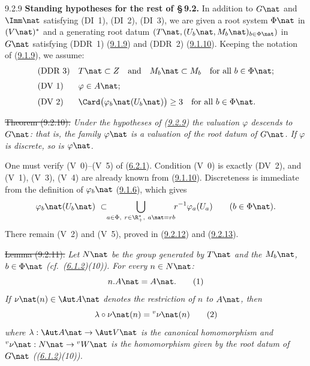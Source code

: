 \documentclass[12pt,a4paper,oneside,english]{smfart}
\makeatletter
\newcommand{\btanchor}[1]{\leavevmode\Hy@raisedlink{\hypertarget{bt:#1}{}}}
\newcommand{\btref}[1]{\hyperlink{bt:#1}{#1}}
\theoremstyle{definition}
\theoremstyle{bt}
\makeatother
\begin{document}
\num{9.2.9}\btanchor{9.2.9} \textbf{Standing hypotheses for the rest of \S\,9.2.}
In addition to $G\nat$ and $\Imm\nat$ satisfying (DI~1), (DI~2), (DI~3), we are
given a root system $\Phi\nat$ in $(V\nat)^{*}$ and a generating root datum
$(T\nat,(U_b\nat,M_b\nat)_{b\in\Phi\nat})$ in $G\nat$ satisfying (DDR~1) (\btref{9.1.9})
and (DDR~2) (\btref{9.1.10}). Keeping the notation of (\btref{9.1.9}), we assume:
\begin{align*}
&\text{(DDR 3)} && T\nat\subset Z \quad\text{and}\quad M_b\nat\subset M_b
                   \quad\text{for all } b\in\Phi\nat;\\[1mm]
&\text{(DV 1)}  && \varphi\in A\nat;\\[1mm]
&\text{(DV 2)}  && \Card\bigl(\varphi_b\nat(U_b\nat)\bigr)\geq 3
                   \quad\text{for all } b\in\Phi\nat.
\end{align*}

\st{Theorem (9.2.10).}
\emph{Under the hypotheses of (\btref{9.2.9}) the valuation $\varphi$ descends to
$G\nat$: that is, the family $\varphi\nat$ is a valuation of the root datum of
$G\nat$. If $\varphi$ is discrete, so is $\varphi\nat$.}

\pf One must verify (V~0)--(V~5) of (\btref{6.2.1}). Condition (V~0) is exactly (DV~2),
and (V~1), (V~3), (V~4) are already known from (\btref{9.1.10}). Discreteness is
immediate from the definition of $\varphi_b\nat$ (\btref{9.1.6}), which gives
\[
\varphi_b\nat(U_b\nat)\ \subset\!\!
\bigcup_{a\in\Phi,\ r\in\R^{*}_{+},\ a\nat=rb}\!\! r^{-1}\varphi_a(U_a)
\qquad (b\in\Phi\nat).
\]
There remain (V~2) and (V~5), proved in (\btref{9.2.12}) and (\btref{9.2.13}).

\st{Lemma (9.2.11).}
\emph{Let $N\nat$ be the group generated by $T\nat$ and the $M_b\nat$,
$b\in\Phi\nat$ (cf.\ (\btref{6.1.2})(10)). For every $n\in N\nat$:}
\begin{equation}
n.A\nat=A\nat. \tag{1}
\end{equation}
\emph{If $\nu\nat(n)\in\Aut A\nat$ denotes the restriction of $n$ to $A\nat$,
then}
\begin{equation}
\lambda\circ\nu\nat(n)={}^{v}\nu\nat(n) \tag{2}
\end{equation}
\emph{where $\lambda:\Aut A\nat\to\Aut V\nat$ is the canonical homomorphism and
${}^{v}\nu\nat:N\nat\to{}^{v}W\nat$ is the homomorphism given by the root datum
of $G\nat$ ((\btref{6.1.2})(10)).}
\end{document}
